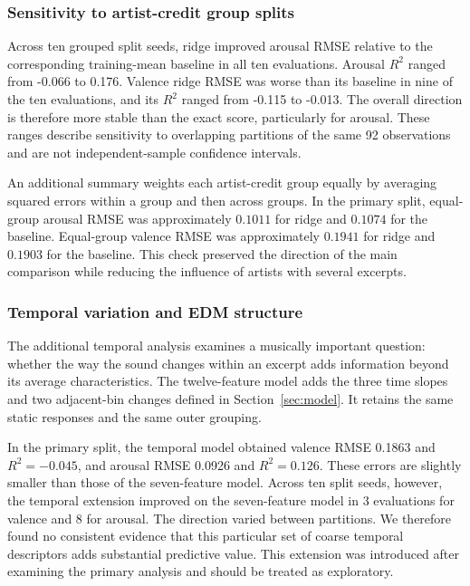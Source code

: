 \subsubsection{Sensitivity to artist-credit group splits}

Across ten grouped split seeds, ridge improved arousal RMSE relative to the corresponding training-mean baseline in all ten evaluations. Arousal $R^2$ ranged from -0.066 to 0.176. Valence ridge RMSE was worse than its baseline in nine of the ten evaluations, and its $R^2$ ranged from -0.115 to -0.013. The overall direction is therefore more stable than the exact score, particularly for arousal. These ranges describe sensitivity to overlapping partitions of the same 92 observations and are not independent-sample confidence intervals.

An additional summary weights each artist-credit group equally by averaging squared errors within a group and then across groups. In the primary split, equal-group arousal RMSE was approximately $0.1011$ for ridge and $0.1074$ for the baseline. Equal-group valence RMSE was approximately $0.1941$ for ridge and $0.1903$ for the baseline. This check preserved the direction of the main comparison while reducing the influence of artists with several excerpts.

\subsubsection{Temporal variation and EDM structure}

The additional temporal analysis examines a musically important question: whether the way the sound changes within an excerpt adds information beyond its average characteristics. The twelve-feature model adds the three time slopes and two adjacent-bin changes defined in Section~\ref{sec:model}. It retains the same static responses and the same outer grouping.

In the primary split, the temporal model obtained valence RMSE 0.1863 and $R^2=-0.045$, and arousal RMSE 0.0926 and $R^2=0.126$. These errors are slightly smaller than those of the seven-feature model. Across ten split seeds, however, the temporal extension improved on the seven-feature model in 3 evaluations for valence and 8 for arousal. The direction varied between partitions. We therefore found no consistent evidence that this particular set of coarse temporal descriptors adds substantial predictive value. This extension was introduced after examining the primary analysis and should be treated as exploratory.

